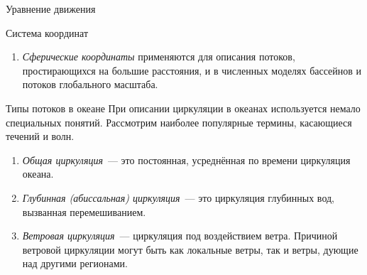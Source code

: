 \begin{chapter}{Уравнение движения}
\begin{section}{Система координат}
\begin{enumerate}
\emph{$\beta$-плоскость}~--- прямоугольная система координат, в которой сила
Кориолиса полагается линейно зависимой от широты. Она используется
для описания потоков в масштабах океанических бассейнов.
%

\item
\emph{Сферические координаты} применяются для описания потоков, простирающихся 
на большие расстояния, и в численных моделях бассейнов и потоков глобального 
масштаба.
%
\end{enumerate}
\end{section}

\begin{section}{Типы потоков в океане}
При описании циркуляции в океанах используется немало специальных понятий.
Рассмотрим наиболее популярные термины, касающиеся течений и волн.
%

\begin{enumerate}
\item
\emph{Общая циркуляция}~--- это постоянная, усреднённая по времени
циркуляция океана.
%

\item
\emph{Глубинная (абиссальная) циркуляция}~--- это циркуляция глубинных вод,
вызванная перемешиванием.
%

\item
\emph{Ветровая циркуляция}~--- циркуляция 
под воздействием ветра. Причиной ветровой циркуляции могут быть 
как локальные ветры, так и ветры, дующие над другими регионами.
%


\end{enumerate}
\end{section}
\end{chapter}
